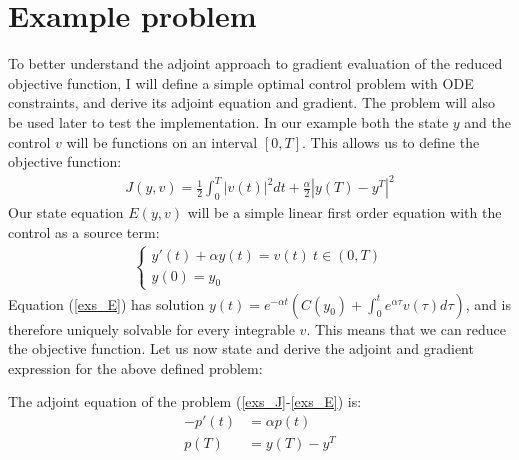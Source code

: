 \section{Example problem}
To better understand the adjoint approach to gradient evaluation of the reduced objective function, I will define a simple optimal control problem with ODE constraints, and derive its adjoint equation and gradient. The problem will also be used later to test the implementation. In our example both the state $y$ and the control $v$ will be functions on an interval $[0,T]$. This allows us to define the objective function:
\begin{align}
J(y,v) = \frac{1}{2}\int_0^T|v(t)|^2dt + \frac{\alpha}{2}|y(T)-y^T|^2 \label{exs_J}
\end{align}
Our state equation $E(y,v)$ will be a simple linear first order equation with the control as a source term:
\begin{align}
\left\{
     \begin{array}{lr}
       	y'(t)+\alpha y(t) = v(t) \ t\in(0,T)\\
       	y(0)=y_0
     \end{array}
   \right. \label{exs_E}
\end{align}
Equation (\ref{exs_E}) has solution $y(t) = e^{-\alpha t}(C(y_0)+\int_0^te^{\alpha\tau}v(\tau)d\tau)$, and is therefore uniquely solvable for every integrable $v$. This means that we can reduce the objective function. Let us now state and derive the adjoint and gradient expression for the above defined problem: 
\begin{theorem}
The adjoint equation of the problem (\ref{exs_J}-\ref{exs_E}) is:
\begin{align*}     
-p'(t) &= \alpha p(t) \\
p(T) &= y(T)-y^T     
\end{align*}
\end{theorem}
